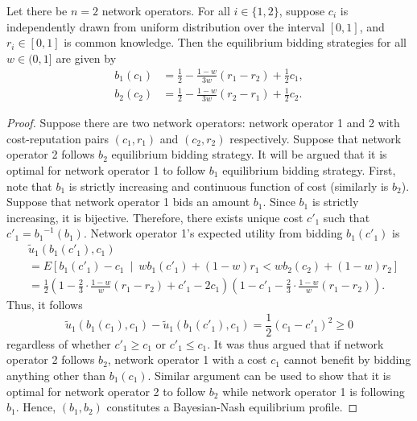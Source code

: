 \begin{propositiona}[\ref{prop:pcomp_equi_bidding_str_direct}]
Let there be $n=2$ network operators. For all $i\in\{1, 2\}$, suppose $c_i$ is independently drawn from uniform distribution over the interval $[0,1]$, and $r_i\in [0,1]$ is common knowledge. Then the equilibrium bidding strategies for all $w\in (0,1]$ are given by
\begin{align}
  b_1(c_1) &= \frac{1}{2} - \frac{1-w}{3w}(r_1-r_2) + \frac{1}{2}c_1,\\[2ex]
  b_2(c_2) &= \frac{1}{2} - \frac{1-w}{3w}(r_2-r_1) + \frac{1}{2}c_2.
\end{align}
\end{propositiona}
\begin{proof}
Suppose there are two network operators: network operator 1 and 2 with cost-reputation pairs $(c_1,r_1)$ and $(c_2,r_2)$ respectively. Suppose that network operator 2 follows $b_2$ equilibrium bidding strategy. It will be argued that it is optimal for network operator 1 to follow $b_1$ equilibrium bidding strategy. First, note that $b_1$ is strictly increasing and continuous function of cost (similarly is $b_2$). Suppose that network operator 1 bids an amount $b_1$. Since $b_1$ is strictly increasing, it is bijective. Therefore, there exists unique cost $c'_1$ such that $c'_1 = {b_1}^{-1}(b_1)$. Network operator 1's expected utility from bidding $b_1(c'_1)$ is
\begin{align}
	&\tilde{u}_1(b_1(c'_1), c_1) \\\nonumber
	&= E \left[ b_1(c'_1) - c_1 \:\middle\vert\: wb_1(c'_1) + (1-w)r_1 < wb_2(c_2) + (1-w)r_2 \right] \\\nonumber
	&= \frac{1}{2} \left( 1 - \frac{2}{3}\cdot\frac{1-w}{w}(r_1-r_2) + c'_1 - 2c_1 \right) \left( 1 - c'_1 - \frac{2}{3}\cdot\frac{1-w}{w}(r_1-r_2) \right).
\end{align}
Thus, it follows
\begin{equation}
	\tilde{u}_1(b_1(c_1), c_1) - \tilde{u}_1(b_1(c'_1), c_1) = \frac{1}{2}(c_1-c'_1)^2 \ge 0
\end{equation}
regardless of whether $c'_1\ge c_1$ or $c'_1 \le c_1$. It was thus argued that if network operator 2 follows $b_2$, network operator 1 with a cost $c_1$ cannot benefit by bidding anything other than $b_1(c_1)$. Similar argument can be used to show that it is optimal for network operator 2 to follow $b_2$ while network operator 1 is following $b_1$. Hence, $(b_1,b_2)$ constitutes a Bayesian-Nash equilibrium profile.
\end{proof}


